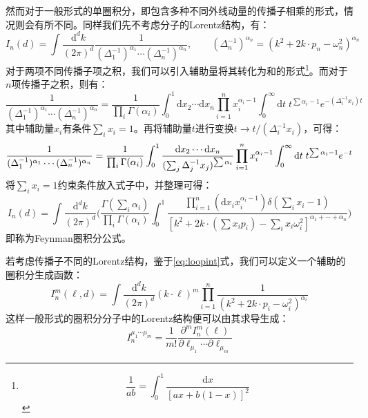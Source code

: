 然而对于一般形式的单圈积分，即包含多种不同外线动量的传播子相乘的形式，情况则会有所不同。同样我们先不考虑分子的Lorentz结构，有：
\begin{equation}
I_n(d)=\int\frac{\mathrm{d}^dk}{(2\pi)^d}\frac{1}{(\Delta_1^{-1})^{\alpha_1}\cdots(\Delta_n^{-1})^{\alpha_n}},\qquad (\Delta^{-1}_n)^{\alpha_n}=(k^2+2k\cdot p_n-\omega_n^2)^{\alpha_n}
\end{equation}
对于两项不同传播子项之积，我们可以引入辅助量将其转化为和的形式\footnote{\[\frac{1}{ab}=\int_0^1\frac{\mathrm{d}x}{[ax+b(1-x)]^2}\]}。而对于$n$项传播子之积，则有：
	\begin{equation}
	\frac{1}{(\Delta_1^{-1})^{\alpha_1}\cdots(\Delta_n^{-1})^{\alpha_n}}=\frac{1}{\prod_i\Gamma(\alpha_i)}\int_0^1\mathrm{d}x_2\cdots\mathrm{d}x_n\prod_{i=1}^n x_i^{\alpha_i-1}\int_0^\infty\mathrm{d}t\;t^{\sum\alpha_i-1}e^{-(\Delta^{-1}_ix_i)t}
	\end{equation}
其中辅助量$x_i$有条件$\sum_i x_i=1$。再将辅助量$t$进行变换$t\rightarrow t/(\Delta^{-1}_ix_i)$，可得：
	\begin{align}
	\frac{1}{(\Delta_1^{-1})^{\alpha_1}\cdots(\Delta_n^{-1})^{\alpha_n}}=\frac{1}{\prod_i\Gamma(\alpha_i)}\int_0^1\frac{\mathrm{d}x_2\cdots\mathrm{d}x_n}{(\sum_j \Delta_j^{-1}x_j)^{\sum\alpha_i}}\prod_{i=1}^n x_i^{\alpha_i-1}\int_0^\infty\mathrm{d}t\;t^{\sum\alpha_i-1}e^{-t}\notag\\
	\end{align}
将$\sum_i x_i=1$约束条件放入式子中，并整理可得：
\begin{equation}
I_n(d)=\int\frac{\mathrm{d}^dk}{(2\pi)^d}\Big(\frac{\Gamma(\sum_i\alpha_i)}{\prod_i\Gamma(\alpha_i)}\int_0^1\frac{\prod_{i=1}^n(\mathrm{d}x_i x_i^{\alpha_i-1})\delta(\sum_i x_i-1)}{[k^2+2k\cdot(\sum x_ip_i)-\sum_i x_i\omega_i^2]^{\alpha_1+\cdots+\alpha_n}}\Big)
\end{equation}
即称为Feynman圈积分公式。

若考虑传播子不同的Lorentz结构，鉴于\eqref{eq:loopint}式，我们可以定义一个辅助的圈积分生成函数：
\begin{equation}
I^m_n(\ell,d)=\int\frac{\mathrm{d}^d k}{(2\pi)^d}(k\cdot\ell)^m\prod_{i=1}^n\frac{1}{(k^2+2k\cdot p_i-\omega_i^2)^{\alpha_i}}
\end{equation}
这样一般形式的圈积分分子中的Lorentz结构便可以由其求导生成：
\begin{equation}
I^{\mu_1\cdots\mu_m}_n=\frac{1}{m!}\frac{\partial^m I^m_n(\ell)}{\partial\ell_{\mu_1}\cdots\partial\ell_{\mu_m}}
\end{equation}

